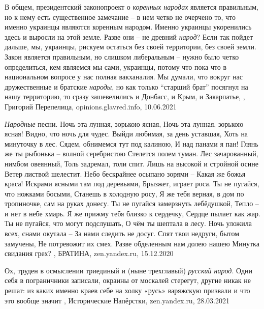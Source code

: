 В общем, президентский законопроект о \emph{коренных народах} является
правильным, но к нему есть существенное замечание – в нем четко не очерчено то,
что именно украинцы являются коренным народом. Именно украинцы укоренились
здесь и выросли на этой земле. Разве они – не древний \emph{народ}? Если так
пойдет дальше, мы, украинцы, рискуем остаться без своей территории, без своей
земли.  Закон является правильным, но слишком либеральным – нужно было четко
определиться, кем являемся мы сами, украинцы, потому что пока что в
национальном вопросе у нас полная вакханалия. Мы думали, что вокруг нас
дружественные и братские \emph{народы}, но как только \enquote{старший брат}
посягнул на нашу территорию, то сразу зашевелились и Донбасс, и Крым, и
Закарпатье,
, 
Григорий Перепелица, opinions.glavred.info, 10.06.2021

\emph{Народные} песни. Ночь эта лунная, зорькою ясная, Ночь эта лунная,
зорькою ясная!  Видно, что ночь для чудес.  Выйди любимая, за день уставшая,
Хоть на минуточку в лес.  Сядем, обнимемся тут под калиною, И над панами я пан!
Глянь же ты рыбонька – волной серебристою Стелется полем туман.  Лес
зачарованный, нимбом овеянный, Толь задремал, толи спит. Лишь на высокой и
стройной осине Ветер листвой шелестит.  Небо бескрайнее осыпано зорями – Какая
же божья краса!  Искрами ясными там под деревьями, Брызжет, играет роса.  Ты не
пугайся, что ножками босыми, Станешь в холодную росу, Я же тебя верная, в дом
по тропиночке, сам на руках донесу.  Ты не пугайся замерзнуть лебёдушкой, Тепло
– и нет в небе хмарь.  Я же прижму тебя близко к сердечку, Сердце пылает как
жар. Ты не пугайся, что могут подслушать, О чём ты шептала в лесу.  Ночь
уложила всех, снами окутала – За нами следить не досуг.  Спят твои недруги,
бытом замучены, Не потревожит их смех.  Разве обделенным нам долею нашею
Минутка свидания грех?
, 
БРАТИНА, zen.yandex.ru, 15.12.2020

Ох, труден в осмыслении триединый и (ныне трехглавый) \emph{русский народ}. Одни себя
в пограничники записали, окраины от москалей стерегут, другие никак не решат:
из каких именно краев себе на холку «русь» варяжскую призвали и что это вообще
значит
, 
Исторические Напёрстки, zen.yandex.ru, 28.03.2021


